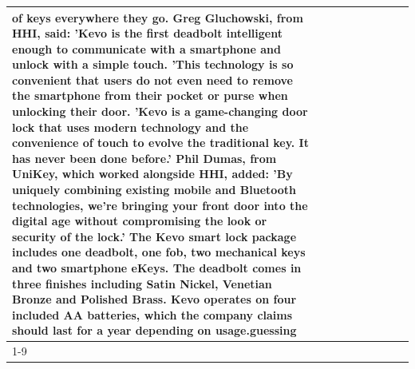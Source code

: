 \begin{table}[H]
\begin{tabular}{lllrlllll}
of keys everywhere they go. Greg Gluchowski, from HHI, said: 'Kevo is the first deadbolt intelligent enough to communicate with a smartphone and unlock with a simple touch. 'This technology is so convenient that users do not even need to remove the smartphone from their pocket or purse when unlocking their door. 'Kevo is a game-changing door lock that uses modern technology and the convenience of touch to evolve the traditional key. It has never been done before.' Phil Dumas, from UniKey, which worked alongside HHI, added: 'By uniquely combining existing mobile and Bluetooth technologies, we’re bringing your front door into the digital age without compromising the look or security of the lock.' The Kevo smart lock package includes one deadbolt, one fob, two mechanical keys and two smartphone eKeys. The deadbolt comes in three finishes including Satin Nickel, Venetian Bronze and Polished Brass. Kevo operates on four included AA batteries, which the company claims should last for a year depending on usage.guessing \\
\cline{1-9}

\end{tabular}
\end{table}
